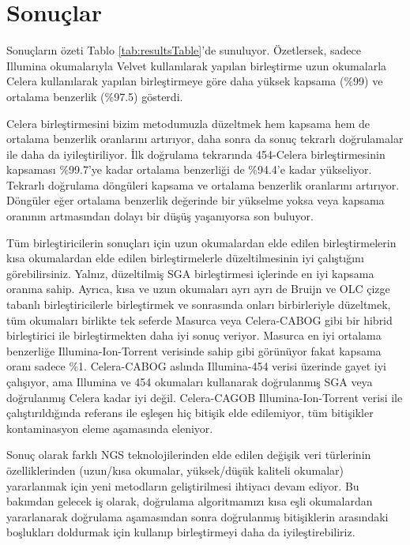 
\section{\bf Sonuçlar}
\label{bac_pinar_sonuc}
Sonuçların özeti Tablo \ref{tab:resultsTable}'de sunuluyor. 
Özetlersek, sadece Illumina okumalarıyla Velvet kullanılarak yapılan birleştirme uzun okumalarla Celera kullanılarak yapılan birleştirmeye göre daha yüksek kapsama (\%99) ve ortalama benzerlik (\%97.5) gösterdi.

Celera birleştirmesini bizim metodumuzla düzeltmek hem kapsama hem de ortalama benzerlik oranlarını artırıyor, daha sonra da sonuç tekrarlı doğrulamalar ile daha da iyileştiriliyor.
İlk doğrulama tekrarında 454-Celera birleştirmesinin kapsaması \%99.7'ye kadar ortalama benzerliği de \%94.4'e kadar yükseliyor. 
Tekrarlı doğrulama döngüleri kapsama ve ortalama benzerlik oranlarını artırıyor. 
Döngüler eğer ortalama benzerlik değerinde bir yükselme yoksa veya kapsama oranının artmasından dolayı bir düşüş yaşanıyorsa son buluyor. 

Tüm birleştiricilerin sonuçları için uzun okumalardan elde edilen birleştirmelerin kısa okumalardan elde edilen birleştirmelerle düzeltilmesinin iyi çalıştığını görebilirsiniz. 
Yalnız, düzeltilmiş SGA birleştirmesi içlerinde en iyi kapsama oranına sahip.
Ayrıca, kısa ve uzun okumaları ayrı ayrı de Bruijn ve OLC çizge tabanlı birleştiricilerle birleştirmek ve sonrasında onları birbirleriyle düzeltmek, tüm okumaları birlikte tek seferde Masurca veya Celera-CABOG gibi bir hibrid birleştirici ile birleştirmekten daha iyi sonuç veriyor. Masurca en iyi ortalama benzerliğe Illumina-Ion-Torrent verisinde sahip gibi görünüyor fakat kapsama oranı sadece \%1. 
Celera-CABOG aslında Illumina-454 verisi üzerinde gayet iyi çalışıyor, ama Illumina ve 454 okumaları kullanarak doğrulanmış SGA veya doğrulanmış Celera kadar iyi değil. 
Celera-CAGOB Illumina-Ion-Torrent verisi ile çalıştırıldığında referans ile eşleşen hiç bitişik elde edilemiyor, tüm bitişikler kontaminasyon eleme aşamasında eleniyor.

Sonuç olarak farklı NGS teknolojilerinden elde edilen değişik veri türlerinin özelliklerinden (uzun/kısa okumalar, yüksek/düşük kaliteli okumalar) yararlanmak için yeni metodların geliştirilmesi ihtiyacı devam ediyor. 
Bu bakımdan gelecek iş olarak, doğrulama algoritmamızı kısa eşli okumalardan yararlanarak doğrulama aşamasından sonra doğrulanmış bitişiklerin arasındaki boşlukları doldurmak için kullanıp birleştirmeyi daha da iyileştirebiliriz.
 

